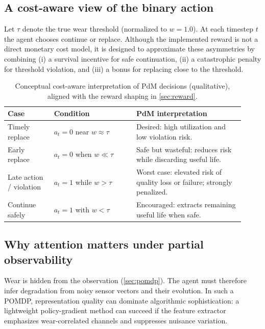 \documentclass[11pt]{article}
\begin{document}
\subsection{A cost-aware view of the binary action}
Let $\tau$ denote the true wear threshold (normalized to $w=1.0$). At each timestep $t$ the agent chooses continue or replace. Although the implemented reward is not a direct monetary cost model, it is designed to approximate these asymmetries by combining (i) a survival incentive for safe continuation, (ii) a catastrophic penalty for threshold violation, and (iii) a bonus for replacing close to the threshold.

\begin{table}[t]
	\centering
	\caption{Conceptual cost-aware interpretation of PdM decisions (qualitative), aligned with the reward shaping in \cref{sec:reward}.}
	\label{tab:cost_view}
	\begin{tabular}{p{0.18\linewidth} p{0.32\linewidth} p{0.42\linewidth}}
		\toprule
		\rowcolor{gray!20} \textbf{Case} & \textbf{Condition} & \textbf{PdM interpretation}\\
		\midrule
		Timely replace & $a_t=0$ near $w\approx\tau$ & Desired: high utilization and low violation risk.\\
		Early replace & $a_t=0$ when $w\ll\tau$ & Safe but wasteful: reduces risk while discarding useful life.\\
		Late action / violation & $a_t=1$ while $w>\tau$ & Worst case: elevated risk of quality loss or failure; strongly penalized.\\
		Continue safely & $a_t=1$ with $w<\tau$ & Encouraged: extracts remaining useful life when safe.\\
		\bottomrule
	\end{tabular}
\end{table}

\subsection{Why attention matters under partial observability}
Wear is hidden from the observation (\cref{sec:pomdp}). The agent must therefore infer degradation from noisy sensor vectors and their evolution. In such a POMDP, representation quality can dominate algorithmic sophistication: a lightweight policy-gradient method can succeed if the feature extractor emphasizes wear-correlated channels and suppresses nuisance variation.
\end{document}
